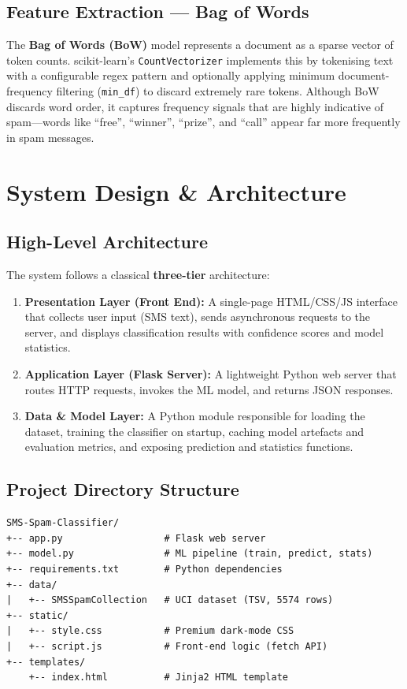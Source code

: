 \documentclass[paper=a4, fontsize=11pt]{scrartcl}
\numberwithin{equation}{section}
\numberwithin{figure}{section}
\numberwithin{table}{section}
\begin{document}
\subsection{Feature Extraction — Bag of Words}
The \textbf{Bag of Words (BoW)} model represents a document as a sparse vector of token counts.  scikit-learn's \texttt{CountVectorizer} implements this by tokenising text with a configurable regex pattern and optionally applying minimum document-frequency filtering (\texttt{min\_df}) to discard extremely rare tokens.  Although BoW discards word order, it captures frequency signals that are highly indicative of spam—words like ``free'', ``winner'', ``prize'', and ``call'' appear far more frequently in spam messages.



\section{System Design \& Architecture}

\subsection{High-Level Architecture}
The system follows a classical \textbf{three-tier} architecture:

\begin{enumerate}
    \item \textbf{Presentation Layer (Front End):} A single-page HTML/CSS/JS interface that collects user input (SMS text), sends asynchronous requests to the server, and displays classification results with confidence scores and model statistics.
    \item \textbf{Application Layer (Flask Server):} A lightweight Python web server that routes HTTP requests, invokes the ML model, and returns JSON responses.
    \item \textbf{Data \& Model Layer:} A Python module responsible for loading the dataset, training the classifier on startup, caching model artefacts and evaluation metrics, and exposing prediction and statistics functions.
\end{enumerate}

\subsection{Project Directory Structure}
\begin{verbatim}
SMS-Spam-Classifier/
+-- app.py                  # Flask web server
+-- model.py                # ML pipeline (train, predict, stats)
+-- requirements.txt        # Python dependencies
+-- data/
|   +-- SMSSpamCollection   # UCI dataset (TSV, 5574 rows)
+-- static/
|   +-- style.css           # Premium dark-mode CSS
|   +-- script.js           # Front-end logic (fetch API)
+-- templates/
    +-- index.html          # Jinja2 HTML template
\end{verbatim}
\end{document}
